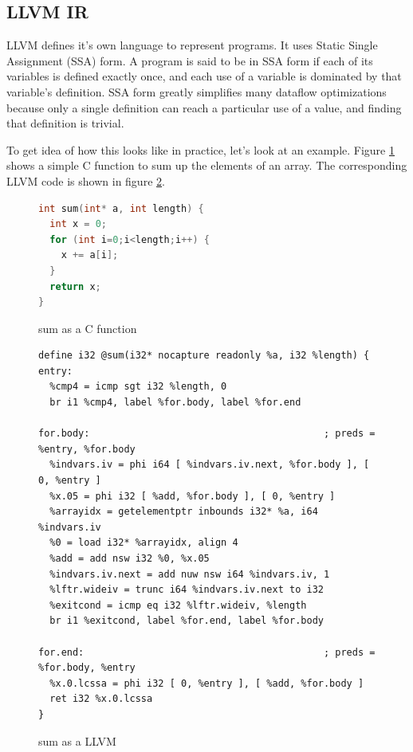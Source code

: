 \documentclass[a4paper,bibliography=totocnumbered,parskip,headsepline]{scrbook}
\begin{document}
\subsection{LLVM IR}
LLVM defines it's own language to represent programs.
It uses Static Single Assignment (SSA) form.\cite{alpern1988detecting,rosen1988global}
A program is said to be in SSA form if each of its variables is defined exactly once, and each use of a variable is dominated by that variable’s definition.
SSA form greatly simplifies many dataflow optimizations because only a single definition can reach a particular use of a value, and finding that definition is trivial.

To get idea of how this looks like in practice, let's look at an example.
Figure \ref{fig:sumc} shows a simple C function to sum up the elements of an array. The corresponding LLVM code is shown in figure \ref{fig:sumll}.

\begin{figure}
\begin{lstlisting}[language=C]
int sum(int* a, int length) {
  int x = 0;
  for (int i=0;i<length;i++) {
    x += a[i];
  }
  return x;
}
\end{lstlisting}
\caption{sum as a C function}
\label{fig:sumc}
\end{figure}

\begin{figure}
\begin{lstlisting}
define i32 @sum(i32* nocapture readonly %a, i32 %length) {
entry:
  %cmp4 = icmp sgt i32 %length, 0
  br i1 %cmp4, label %for.body, label %for.end

for.body:                                         ; preds = %entry, %for.body
  %indvars.iv = phi i64 [ %indvars.iv.next, %for.body ], [ 0, %entry ]
  %x.05 = phi i32 [ %add, %for.body ], [ 0, %entry ]
  %arrayidx = getelementptr inbounds i32* %a, i64 %indvars.iv
  %0 = load i32* %arrayidx, align 4
  %add = add nsw i32 %0, %x.05
  %indvars.iv.next = add nuw nsw i64 %indvars.iv, 1
  %lftr.wideiv = trunc i64 %indvars.iv.next to i32
  %exitcond = icmp eq i32 %lftr.wideiv, %length
  br i1 %exitcond, label %for.end, label %for.body

for.end:                                          ; preds = %for.body, %entry
  %x.0.lcssa = phi i32 [ 0, %entry ], [ %add, %for.body ]
  ret i32 %x.0.lcssa
}
\end{lstlisting}
\caption{sum as a LLVM}
\label{fig:sumll}
\end{figure}
\end{document}
